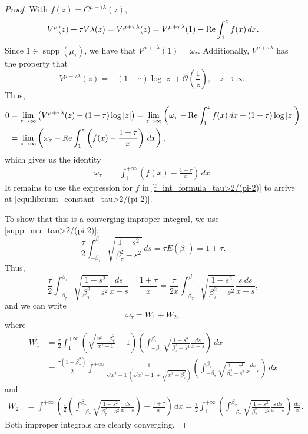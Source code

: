 \documentclass[reqno,11pt]{amsart}
\theoremstyle{plain}
\theoremstyle{definition}
\theoremstyle{remark}
\numberwithin{equation}{section}
\renewcommand{\Re}{\mathop{\rm Re}}
\DeclareMathOperator{\supp}{supp}
\begin{document}
\begin{proof}
With $
f(z)=C^{\mu +\tau \lambda}(z)$, 
$$
V^\mu(z)+\tau V\lambda(z)=V^{\mu+\tau \lambda}(z)=V^{\mu+\tau \lambda}(1)-\Re \int_1^z f(x)\,dx.
$$
Since $1\in\supp(\mu_\tau)$, we have that $V^{\mu+\tau \lambda}(1)=\omega_\tau$. Additionally, $V^{\mu+\tau \lambda}$ has the property that
$$
V^{\mu+\tau \lambda}(z)=-(1+\tau) \log|z|+ \mathcal O\left(\frac{1}{z} \right), \quad z\to \infty.
$$
Thus,
\begin{align*}
 0&=   \lim_{z\to \infty} \left( V^{\mu+\tau \lambda}(z)+(1+\tau) \log|z|\right)= \lim_{z\to \infty} \left( \omega_\tau -\Re \int_1^z f(x)\,dx +(1+\tau) \log|z|\right) \\
 &= \lim_{z\to \infty} \left( \omega_\tau -\Re \int_1^z \left( f(x)-\frac{1+\tau}{x}\right)\,dx  \right),
\end{align*}
which gives us the identity
\begin{align*}
\omega_\tau&=  \int_1^{+\infty} \left( f(x)-\frac{1+\tau}{x}\right)\,dx.
\end{align*}
It remains to use the expression for $f$ in  \eqref{f_int_formula_tau>2/(pi-2)} to arrive at \eqref{equilibrium_constant_tau>2/(pi-2)}. 

To show that this is a converging improper integral, we use \eqref{supp_mu_tau>2/(pi-2)}:
\begin{equation*}
  \frac{\tau}{2}   \int_{-\beta_\tau}^{\beta_\tau}\sqrt{\frac{1-s^2}{\beta_\tau^2-s^2}}\, ds = \tau E(\beta_\tau)= 1+\tau.
\end{equation*}
Thus,
$$
\frac{\tau}{2}   \int_{-\beta_\tau}^{\beta_\tau}\sqrt{\frac{1-s^2}{\beta_\tau^2-s^2}}\frac{ds}{x-s} - \frac{1+\tau}{x}= \frac{\tau}{2x}   \int_{-\beta_\tau}^{\beta_\tau}\sqrt{\frac{1-s^2}{\beta_\tau^2-s^2}}\frac{s\ ds}{x-s},
$$
and we can write
$$
\omega_\tau  = W_1+W_2,
$$
where
\begin{align*}
W_1 & = \frac{\tau}{2}\int_1^{+\infty} \left(\sqrt{\frac{x^2-\beta_\tau^2}{x^2-1}} -1\right)\left( \int_{-\beta_\tau}^{\beta_\tau}\sqrt{\frac{1-s^2}{\beta_\tau^2-s^2}}\frac{ds}{x-s} \right) \,dx\\
&= \frac{\tau(1-\beta_\tau^2)}{2}\int_1^{+\infty} \frac{1}{\sqrt{ x^2-1} \left( \sqrt{ x^2-1}+\sqrt{ x^2-\beta_\tau^2}\right) } \left( \int_{-\beta_\tau}^{\beta_\tau}\sqrt{\frac{1-s^2}{\beta_\tau^2-s^2}}\frac{ds}{x-s} \right) \,dx
\end{align*}
and
\begin{align*}
W_2 & = \int_1^{+\infty} \left(\frac{\tau}{2}  \left( \int_{-\beta_\tau}^{\beta_\tau}\sqrt{\frac{1-s^2}{\beta_\tau^2-s^2}}\frac{ds}{x-s} \right)-\frac{1+\tau}{x}\right)\,dx = \frac{\tau }{2}\int_1^{+\infty}   \left( \int_{-\beta_\tau}^{\beta_\tau}\sqrt{\frac{1-s^2}{\beta_\tau^2-s^2}}\frac{s \, ds}{x-s} \right) \,\frac{dx}{x}.
\end{align*}
Both improper integrals are clearly converging. 


\end{proof}
\end{document}
